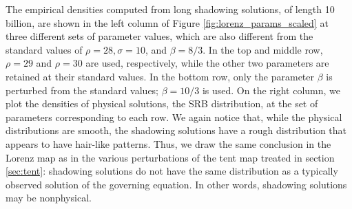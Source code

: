 The empirical densities computed from long shadowing solutions, of length 10 billion, are shown in the left column of Figure \ref{fig:lorenz_params_scaled} at three different sets of parameter values, which are also different from the standard values of $\rho = 28, \sigma = 10$, and $\beta = 8/3$. 
In the top and middle row, $\rho = 29$ and $\rho = 30$ are used, respectively, while the other two parameters are retained at their standard values. In the bottom row, only the parameter $\beta$ is perturbed from the standard values; $\beta = 10/3$ is used. On the right column, we plot the densities of physical solutions, the SRB distribution, at the set of parameters corresponding to each row. We again notice that, while the physical distributions are smooth, the shadowing solutions have a rough distribution that appears to have hair-like patterns. Thus, we draw the same conclusion in the Lorenz map as in the various perturbations of the tent map treated in section \ref{sec:tent}: shadowing solutions do not have the same distribution as a typically observed solution of the governing equation. In other words, shadowing solutions may be nonphysical.



